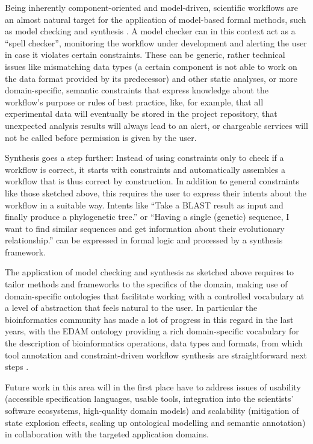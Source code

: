 \documentclass[sigplan,10pt,noacm]{acmart}
\begin{document}
Being inherently component-oriented and model-driven, scientific workflows are an almost natural target for the application of model-based formal methods, such as model checking and synthesis \cite{LaMaSt2008,Lampre2013}.
A model checker can in this context act as a \enquote{spell checker}, monitoring the workflow under development and alerting the user in case it violates certain constraints. These can be generic, rather technical issues like mismatching data types (a certain component is not able to work on the data format provided by its predecessor) and other static analyses, or more domain-specific, semantic constraints that express knowledge about the workflow's purpose or rules of best practice, like, for example, that all experimental data will eventually be stored in the project repository, that unexpected analysis results will always lead to an alert, or chargeable services will not be called before permission is given by the user.

Synthesis goes a step further: Instead of using constraints only to check if a workflow is correct, it starts with constraints and automatically assembles a workflow that is thus correct by construction. In addition to general constraints like those sketched above, this requires the user to express their intents about the workflow in a suitable way. Intents like \enquote{Take a BLAST result as input and finally produce a phylogenetic tree.} or \enquote{Having a single (genetic) sequence, I want to find similar sequences and get information about their evolutionary relationship.} can be expressed in formal logic and processed by a synthesis framework.

The application of model checking and synthesis as sketched above requires to tailor methods and frameworks to the specifics of the domain, making use of domain-specific ontologies that facilitate working with a controlled vocabulary at a level of abstraction that feels natural to the user. In particular the bioinformatics community has made a lot of progress in this regard in the last years, with the EDAM ontology providing a rich domain-specific vocabulary for the description of bioinformatics operations, data types and formats, from which tool annotation and constraint-driven workflow synthesis are straightforward next steps \cite{PaLaIS2018}. 

Future work in this area will in the first place have to address issues of usability (accessible specification languages, usable tools, integration into the scientists' software ecosystems, high-quality domain models) and scalability (mitigation of state explosion effects, scaling up ontological modelling and semantic annotation) in collaboration with the targeted application domains. 
\end{document}
